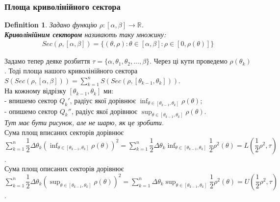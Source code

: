 \documentclass[a4paper, 10pt]{article}
\def\huge{\displaystyle}
\theoremstyle{theoremdd}
\theoremstyle{theoremdd}
\theoremstyle{theoremdd}
\newtheorem{definition}[theorem]{Definition}
\theoremstyle{theoremdd}
\theoremstyle{theoremdd}
\theoremstyle{theoremdd}
\theoremstyle{theoremdd}
\theoremstyle{theoremdd}
\theoremstyle{theoremdd}
\begin{document}
\subsubsection{Площа криволінійного сектора}
\begin{definition}
Задано функцію $\rho: [\alpha, \beta] \to \mathbb{R}$.\\
\textbf{Криволінійним сектором} називають таку множину:
\begin{align*}
Sec(\rho,[\alpha,\beta]) = \{(\theta,\rho) : \theta \in [\alpha,\beta]: \rho \in [0,\rho(\theta)] \}
\end{align*}
\begin{figure}[H]
\centering
{}
\end{figure}
\end{definition}
Задамо тепер деяке розбиття $\tau = \{\alpha, \theta_1,\theta_2,\dots,\beta \}$. Через ці кути проведемо $\rho(\theta_k)$. Тоді площа нашого криволінійного сектора $S(Sec(\rho,[\alpha,\beta])) =\huge\sum_{k=1}^n S(Sec(\rho, [\theta_{k-1}, \theta_k]))$.\\
На кожному відрізку $[\theta_{k-1}, \theta_k]$ ми:\\
- впишемо сектор $Q_k'$, радіус якої дорівнює $\huge\inf_{\theta \in [\theta_{k-1}, \theta_k]} \rho(\theta)$;\\
- опишемо сектор $Q_k''$, радіус якої дорівнює $\huge\sup_{\theta \in [\theta_{k-1}, \theta_k]} \rho(\theta)$.\\
\textit{Тут має бути рисунок, але не шарю, як це зробити.}\\
Сума площ вписаних секторів дорівнює $\huge\sum_{k=1}^n \dfrac{1}{2} \Delta \theta_k \huge \left(\inf_{\theta \in [\theta_{k-1}, \theta_k]} \rho(\theta) \right)^2 = \huge\sum_{k=1}^n \dfrac{1}{2} \Delta \theta_k \huge \inf_{\theta \in [\theta_{k-1}, \theta_k]} \dfrac{1}{2} \rho^2(\theta) = L \left( \dfrac{1}{2} \rho^2, \tau \right)$.\\
Сума площ описаних секторів дорівнює $\huge\sum_{k=1}^n \dfrac{1}{2} \Delta \theta_k \huge \left(\sup_{\theta \in [\theta_{k-1}, \theta_k]} \rho(\theta) \right)^2 = \huge\sum_{k=1}^n \Delta \theta_k \huge \sup_{\theta \in [\theta_{k-1}, \theta_k]} \dfrac{1}{2} \rho^2(\theta) = U \left( \dfrac{1}{2} \rho^2, \tau \right)$.
\end{document}
